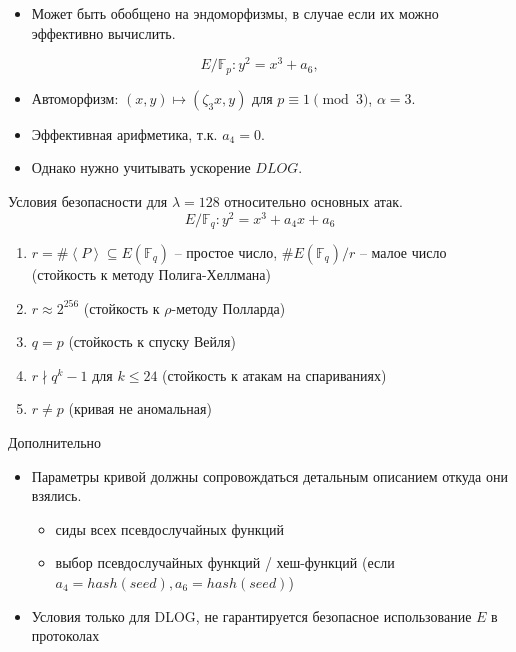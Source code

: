 \documentclass{beamer}
\begin{document}
\begin{frame}
    \begin{itemize}
    \item Может быть обобщено на эндоморфизмы, в случае если их можно эффективно вычислить.
    \end{itemize}

    \[E/\mathbb{F}_p: y^2 = x^3 + a_6,\]
    \begin{itemize}
        \item Автоморфизм: $(x,y) \mapsto (\zeta_3 x, y)$ для $p \equiv 1 \pmod{3}$, $\alpha = 3$.
        \item Эффективная арифметика, т.к. $a_4 = 0$.
        \item Однако нужно учитывать ускорение $DLOG$.
    \end{itemize}
\end{frame}

\begin{frame}{Условия безопасности для $\lambda = 128$ относительно основных атак.}
    \[E/\mathbb{F}_q: y^2 = x^3 + a_4 x + a_6\]
    \begin{enumerate}
        \item $r = \#\left<P\right> \subseteq E(\mathbb{F}_q)$ -- простое число, $\#E(\mathbb{F}_q) / r$ -- малое число (стойкость к методу Полига-Хеллмана)
        \item $r \approx 2^{256}$ (стойкость к $\rho$-методу Полларда) 
        \item $q = p$ (стойкость к спуску Вейля)
        \item $r \nmid q^k - 1$ для $k \leq 24$ (стойкость к атакам на спариваниях)
        \item $r \neq p$ (кривая не аномальная)
    \end{enumerate}
\end{frame}

\begin{frame}{Дополнительно}
    \begin{itemize}
        \item Параметры кривой должны сопровождаться детальным описанием откуда они взялись.
        \begin{itemize}
            \item сиды всех псевдослучайных функций
            \item выбор псевдослучайных функций / хеш-функций (если $a_4 = hash(seed), a_6 = hash(seed)$)
        \end{itemize}
        \item Условия только для DLOG, не гарантируется безопасное использование $E$ в протоколах
    \end{itemize}
\end{frame}
\end{document}
